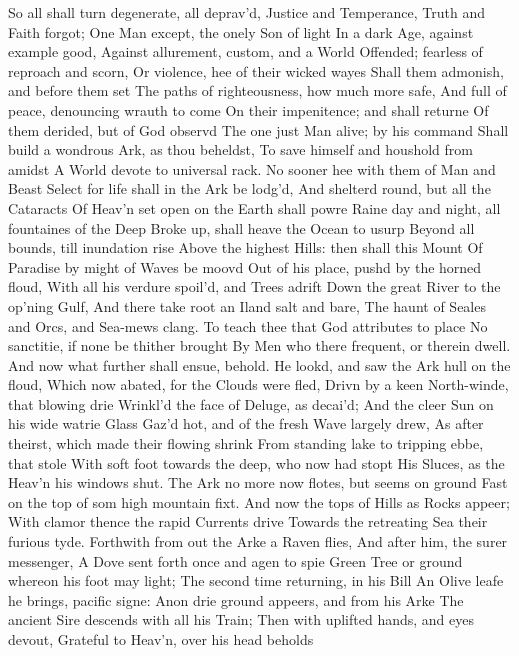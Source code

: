 \documentclass[11pt]{book}
\begin{document}
So all shall turn degenerate, all deprav'd, 
Justice and Temperance, Truth and Faith forgot; 
One Man except, the onely Son of light 
In a dark Age, against example good, 
Against allurement, custom, and a World 
Offended; fearless of reproach and scorn, 
Or violence, hee of their wicked wayes 
Shall them admonish, and before them set 
The paths of righteousness, how much more safe, 
And full of peace, denouncing wrauth to come 
On their impenitence; and shall returne 
Of them derided, but of God observd 
The one just Man alive; by his command 
Shall build a wondrous Ark, as thou beheldst, 
To save himself and houshold from amidst 
A World devote to universal rack. 
No sooner hee with them of Man and Beast 
Select for life shall in the Ark be lodg'd, 
And shelterd round, but all the Cataracts 
Of Heav'n set open on the Earth shall powre 
Raine day and night, all fountaines of the Deep 
Broke up, shall heave the Ocean to usurp 
Beyond all bounds, till inundation rise 
Above the highest Hills: then shall this Mount 
Of Paradise by might of Waves be moovd 
Out of his place, pushd by the horned floud, 
With all his verdure spoil'd, and Trees adrift 
Down the great River to the op'ning Gulf, 
And there take root an Iland salt and bare, 
The haunt of Seales and Orcs, and Sea-mews clang. 
To teach thee that God attributes to place 
No sanctitie, if none be thither brought 
By Men who there frequent, or therein dwell. 
And now what further shall ensue, behold. 
\quad He lookd, and saw the Ark hull on the floud, 
Which now abated, for the Clouds were fled, 
Drivn by a keen North-winde, that blowing drie 
Wrinkl'd the face of Deluge, as decai'd; 
And the cleer Sun on his wide watrie Glass 
Gaz'd hot, and of the fresh Wave largely drew, 
As after theirst, which made their flowing shrink 
From standing lake to tripping ebbe, that stole 
With soft foot towards the deep, who now had stopt 
His Sluces, as the Heav'n his windows shut. 
The Ark no more now flotes, but seems on ground 
Fast on the top of som high mountain fixt. 
And now the tops of Hills as Rocks appeer; 
With clamor thence the rapid Currents drive 
Towards the retreating Sea their furious tyde. 
Forthwith from out the Arke a Raven flies, 
And after him, the surer messenger, 
A Dove sent forth once and agen to spie 
Green Tree or ground whereon his foot may light; 
The second time returning, in his Bill 
An Olive leafe he brings, pacific signe: 
Anon drie ground appeers, and from his Arke 
The ancient Sire descends with all his Train; 
Then with uplifted hands, and eyes devout, 
Grateful to Heav'n, over his head beholds 
\end{document}
